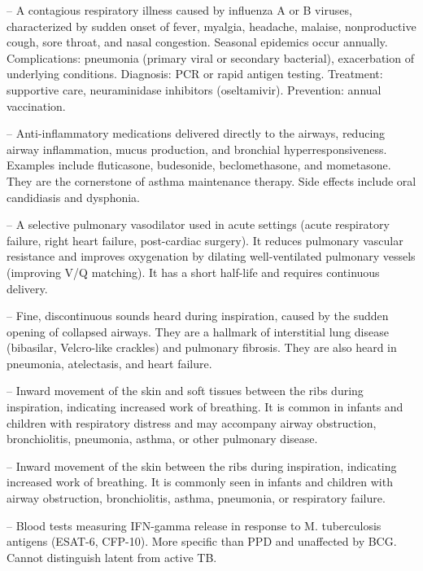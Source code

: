 -- A contagious respiratory illness caused by influenza A or B viruses, characterized by sudden onset of fever, myalgia, headache, malaise, nonproductive cough, sore throat, and nasal congestion. Seasonal epidemics occur annually. Complications: pneumonia (primary viral or secondary bacterial), exacerbation of underlying conditions. Diagnosis: PCR or rapid antigen testing. Treatment: supportive care, neuraminidase inhibitors (oseltamivir). Prevention: annual vaccination.

-- Anti-inflammatory medications delivered directly to the airways, reducing airway inflammation, mucus production, and bronchial hyperresponsiveness. Examples include fluticasone, budesonide, beclomethasone, and mometasone. They are the cornerstone of asthma maintenance therapy. Side effects include oral candidiasis and dysphonia.

-- A selective pulmonary vasodilator used in acute settings (acute respiratory failure, right heart failure, post-cardiac surgery). It reduces pulmonary vascular resistance and improves oxygenation by dilating well-ventilated pulmonary vessels (improving V/Q matching). It has a short half-life and requires continuous delivery.

-- Fine, discontinuous sounds heard during inspiration, caused by the sudden opening of collapsed airways. They are a hallmark of interstitial lung disease (bibasilar, Velcro-like crackles) and pulmonary fibrosis. They are also heard in pneumonia, atelectasis, and heart failure.

-- Inward movement of the skin and soft tissues between the ribs during inspiration, indicating increased work of breathing. It is common in infants and children with respiratory distress and may accompany airway obstruction, bronchiolitis, pneumonia, asthma, or other pulmonary disease.

-- Inward movement of the skin between the ribs during inspiration, indicating increased work of breathing. It is commonly seen in infants and children with airway obstruction, bronchiolitis, asthma, pneumonia, or respiratory failure.

-- Blood tests measuring IFN-gamma release in response to M. tuberculosis antigens (ESAT-6, CFP-10). More specific than PPD and unaffected by BCG. Cannot distinguish latent from active TB.

